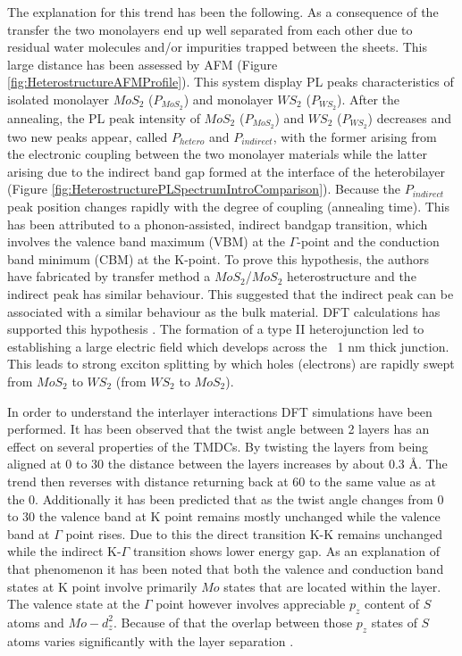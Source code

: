 The explanation for this trend has been the following. As a consequence of the transfer the two monolayers end up well separated from each other due to residual water molecules and/or impurities trapped between the sheets. This large distance has been assessed by AFM (Figure \ref{fig:HeterostructureAFMProfile}). This system display PL peaks characteristics of isolated monolayer $MoS_2$ ($P_{MoS_2}$) and monolayer $WS_2$ ($P_{WS_2}$). After the annealing, the PL peak intensity of $MoS_2$ ($P_{MoS_2}$) and $WS_2$ ($P_{WS_2}$) decreases and two new peaks appear, called $P_{hetero}$ and $P_{indirect}$, with the former arising from the electronic coupling between the two monolayer materials while the latter arising due to the indirect band gap formed at the interface of the heterobilayer (Figure \ref{fig:HeterostructurePLSpectrumIntroComparison}). Because the $P_{indirect}$ peak position changes rapidly with the degree of coupling (annealing time). This has been attributed to a phonon-assisted, indirect bandgap transition, which involves the valence band maximum (VBM) at the {$\Gamma$}-point and the conduction band minimum (CBM) at the K-point. To prove this hypothesis, the authors have fabricated by transfer method a $MoS_2$/$MoS_2$ heterostructure and the indirect peak has similar behaviour. This suggested that the indirect peak can be associated with a similar behaviour as the bulk material. DFT calculations has supported this hypothesis \cite{Zande2014}. The formation of a type II heterojunction led to establishing a large electric field which develops across the ~1 nm thick junction. This leads to strong exciton splitting by which holes (electrons) are rapidly swept from $MoS_2$ to $WS_2$ (from $WS_2$  to $MoS_2$).

In order to understand the interlayer interactions DFT simulations have been performed. It has been observed that the twist angle between 2 layers has an effect on several properties of the TMDCs. By twisting the layers from being aligned at 0{\degree} to 30{\degree} the distance between the layers increases by about 0.3 \r{A}. The trend then reverses with distance returning back at 60 {\degree} to the same value as at the 0{\degree}. Additionally it has been predicted that as the twist angle changes from 0{\degree} to 30{\degree} the valence band at K point remains mostly unchanged while the valence band at $\Gamma$ point rises. Due to this the direct transition K-K remains unchanged while the indirect K-$\Gamma$ transition shows lower energy gap. As an explanation of that phenomenon it has been noted that both the valence and conduction band states at K point involve primarily $Mo$ states that are located within the layer. The valence state at the $\Gamma$ point however involves appreciable $p_z$ content of $S$ atoms and $Mo-d_z^2$. Because of that the overlap between those $p_z$ states of $S$ atoms varies significantly with the layer separation \cite{Nayak2017}.

